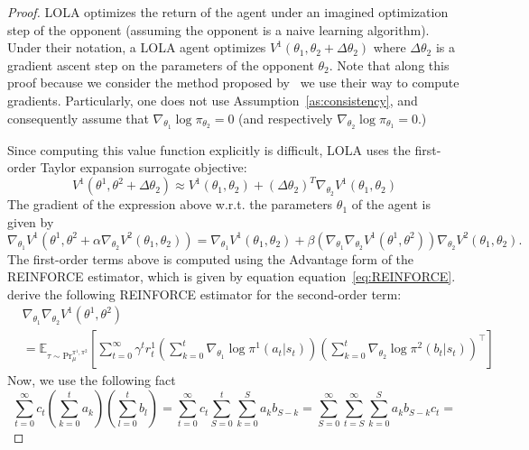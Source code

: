 \documentclass{article} \usepackage{iclr2025_conference,times}
\def\eqref#1{equation~\ref{#1}}
\begin{document}
\begin{proof}
LOLA \citep{foerster2018learning} optimizes the return of the agent under an imagined optimization step of the opponent (assuming the opponent is a naive learning algorithm). Under their notation, a LOLA agent optimizes $V^1(\theta_1, \theta_2 + \Delta\theta_2)$ where $\Delta\theta_2$ is a gradient ascent step on the parameters of the opponent $\theta_2$. Note that along this proof because we consider the method proposed by~\citep{foerster2018learning} we use their way to compute gradients. Particularly,  one does not use Assumption~\ref{as:consistency}, and consequently assume that $\nabla_{\theta_1} \log \pi_{\theta_2} =0$ (and respectively  $\nabla_{\theta_2} \log \pi_{\theta_1} =0$.) 

Since computing this value function explicitly is difficult, LOLA uses the first-order Taylor expansion surrogate objective:
\begin{equation}
    V^1(\theta^1, \theta^2 + \Delta\theta_2) \approx V^1(\theta_1, \theta_2) + \left( \Delta\theta_2 \right)^T \nabla_{\theta_2} V^1(\theta_1, \theta_2)
\end{equation}
The gradient of the expression above w.r.t. the parameters $\theta_1$ of the agent  is given by
\begin{equation}
    \label{eq:LOLA-GRAD}
    \nabla_{\theta_1}V^1(\theta^1, \theta^2 + \alpha \nabla_{\theta_2} V^2(\theta_1,\theta_2)) =
    \nabla_{\theta_1}V^1(\theta_1, \theta_2) + \beta
    \left(\nabla_{\theta_1}\nabla_{\theta_2}V^1(\theta^1, \theta^2)\right)   
    \nabla_{\theta_2} V^2(\theta_1, \theta_2)
    .
\end{equation}
The first-order terms above is computed using the Advantage form of the REINFORCE estimator, which is given by equation \eqref{eq:REINFORCE}. \citet{foerster2018learning} derive the following REINFORCE estimator for the second-order term:
\begin{align}
    &\nabla_{\theta_1}\nabla_{\theta_2}V^1(\theta^1, \theta^2) \\
    &=\mathbb{E}_{\tau \sim \text{Pr}_{\mu}^{\pi^1, \pi^2}}\left[\sum_{t=0}^\infty \gamma^t r^1_t\left(\sum_{k=0}^t \nabla_{\theta_1}\log \pi^1(a_t|s_t) \right)\left(\sum_{k=0}^t \nabla_{\theta_2}\log \pi^2(b_t|s_t)\right)^\top\right]
\end{align}
Now, we use the following fact
\begin{equation}
    \sum_{t=0}^\infty c_t (\sum_{k=0}^t a_k)(\sum_{l=0}^t b_l)=   \sum_{t=0}^\infty c_t \sum_{S=0}^t \sum_{k=0}^S a_k b_{S-k} =
    \sum_{S=0}^\infty \sum_{t=S}^\infty\sum_{k=0}^S a_k b_{S-k} c_t=

\end{equation}
\end{proof}
\end{document}
